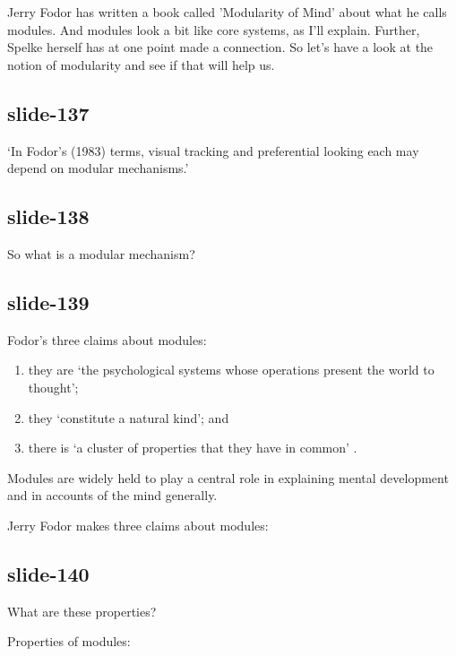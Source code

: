 \documentclass[12pt,\papersize]{extarticle}
\begin{document}
Jerry Fodor has written a book called 'Modularity of Mind' about what he calls modules.
And modules look a bit like core systems, as I'll explain.
Further, Spelke herself has at one point made a connection.
So let's have a look at the notion of modularity and see if that will help us.

\subsection{slide-137}
‘In Fodor’s (1983) terms, visual tracking and preferential looking each may depend on modular mechanisms.’
\citep[p.\ 137]{spelke:1995_spatiotemporal}

\subsection{slide-138}
So what is a modular mechanism?

\subsection{slide-139}
Fodor’s three claims about modules:

\begin{enumerate}

\item they are ‘the psychological systems whose operations present the world to thought’;

\item they ‘constitute a natural kind’; and

\item there is ‘a cluster of properties that they have in common’ \citep[p.\ 101]{Fodor:1983dg}.

\end{enumerate}

Modules are widely held to play a central role in explaining mental development and in accounts of the mind generally.

Jerry Fodor makes three claims about modules:

\subsection{slide-140}
What are these properties?

Properties of modules:
\end{document}

